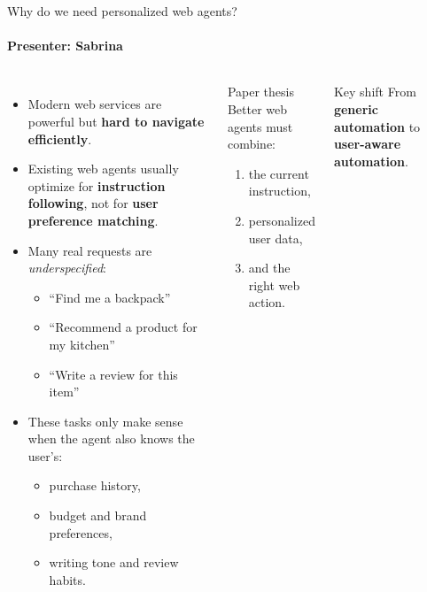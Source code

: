 \documentclass[10pt]{beamer}
\newcommand{\keypoint}[1]{\textcolor{uOttawaPrimary}{\textbf{#1}}}
\newcommand{\speaker}[1]{\framesubtitle{Presenter: #1}}
\begin{document}
\begin{frame}{Why do we need personalized web agents?}
  \speaker{Sabrina}
  \begin{columns}[T,onlytextwidth]
      \begin{itemize}
        \item Modern web services are powerful but \keypoint{hard to navigate efficiently}.
        \item Existing web agents usually optimize for \keypoint{instruction following}, not for \keypoint{user preference matching}.
        \item Many real requests are \textit{underspecified}:\
        \begin{itemize}
          \item ``Find me a backpack''
          \item ``Recommend a product for my kitchen''
          \item ``Write a review for this item''
        \end{itemize}
        \item These tasks only make sense when the agent also knows the user's:
        \begin{itemize}
          \item purchase history,
          \item budget and brand preferences,
          \item writing tone and review habits.
        \end{itemize}
      \end{itemize}
      \begin{block}{Paper thesis}
        \small
        Better web agents must combine:
        \begin{enumerate}
          \item the current instruction,
          \item personalized user data,
          \item and the right web action.
        \end{enumerate}
      \end{block}
      \begin{block}{Key shift}
        \small
        From \textbf{generic automation} to \textbf{user-aware automation}.
      \end{block}
  \end{columns}
\end{frame}
\end{document}
